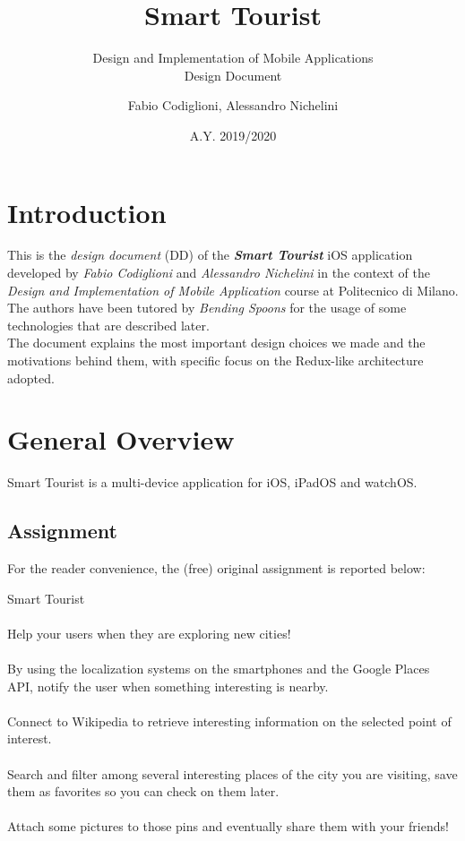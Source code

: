\documentclass[a4paper, 11pt, parskip=half]{scrreprt}
\title{Smart Tourist}
\subtitle{Design and Implementation of Mobile Applications\\Design Document}
\date{A.Y. 2019/2020}
\author{Fabio Codiglioni, Alessandro Nichelini}
\theoremstyle{definition}
\newenvironment{info}[1][Info:]{ %
	\medskip
	\begin{mdframed}[style=info]
		\noindent{\textbf{#1}}
}{
	\end{mdframed}
}
\begin{document}
\maketitle
\tableofcontents
\newpage
{}



\chapter{Introduction}

This is the \textit{design document} (DD) of the \textbf{\textit{Smart Tourist}} iOS application developed by \textit{Fabio Codiglioni} and \textit{Alessandro Nichelini} in the context of the \textit{Design and Implementation of Mobile Application} course at Politecnico di Milano. The authors have been tutored by \textit{Bending Spoons} for the usage of some technologies that are described later.\\
The document explains the most important design choices we made and the motivations behind them, with specific focus on the Redux-like architecture adopted.




\chapter{General Overview}

Smart Tourist is a multi-device application for iOS, iPadOS and watchOS.

\section{Assignment}
For the reader convenience, the (free) original assignment is reported below:
\begin{info}[Assignment:]
	 Smart Tourist
	 \\\\Help your users when they are exploring new cities!
	 \\\\By using the localization systems on the smartphones and the Google Places API, notify the user when something interesting is nearby.
	 \\\\Connect to Wikipedia to retrieve interesting information on the selected point of interest.
	 \\\\Search and filter among several interesting places of the city you are visiting, save them as favorites so you can check on them later.
	 \\\\Attach some pictures to those pins and eventually share them with your friends!
\end{info}
\end{document}
